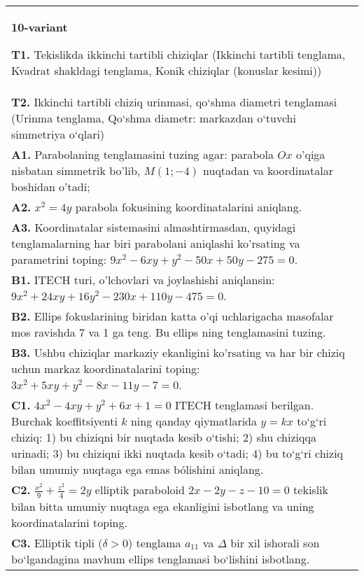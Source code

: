 \documentclass{article}
\begin{document}
\begin{tabular}{m{17cm}}
\textbf{10-variant}
\newline

\textbf{T1.} Tekislikda ikkinchi tartibli chiziqlar (Ikkinchi tartibli tenglama, Kvadrat shakldagi tenglama, Konik chiziqlar (konuslar kesimi)) \\
\textbf{T2.} Ikkinchi tartibli chiziq urinmasi, qo‘shma diametri tenglamasi (Urinma tenglama, Qo‘shma diametr: markazdan o‘tuvchi simmetriya o‘qlari) \\
\textbf{A1.} Parabolaning tenglamasini tuzing agar: parabola $O x$ o'qiga nisbatan simmetrik bo'lib, $M(1 ;-4)$ nuqtadan va koordinatalar boshidan o'tadi; \\
\textbf{A2.} $x^2=4 y$ parabola fokusining koordinatalarini aniqlang. \\
\textbf{A3.} Koordinatalar sistemasini almashtirmasdan, quyidagi tenglamalarning har biri parabolani aniqlashi ko'rsating va parametrini toping: $9 x^2-6 x y+y^2-50 x+50 y-275=0$. \\
\textbf{B1.} ITECH turi, o'lchovlari va joylashishi aniqlansin: $9 x^2+24 x y+16 y^2-230 x+110 y-475=0$. \\
\textbf{B2.} Ellips fokuslarining biridan katta o'qi uchlarigacha masofalar mos ravishda 7 va 1 ga teng. Bu ellips ning tenglamasini tuzing. \\
\textbf{B3.} Ushbu chiziqlar markaziy ekanligini ko'rsating va har bir chiziq uchun markaz koordinatalarini toping: $3x^2+5xy+y^2-8x-11y-7=0$. \\
\textbf{C1.} $4 x^2-4 x y+y^2+6 x+1=0$ ITECH tenglamasi berilgan. Burchak koeffitsiyenti $k$ ning qanday qiymatlarida $y=kx$ to‘g‘ri chiziq: 1) bu chiziqni bir nuqtada kesib o‘tishi; 2) shu chiziqqa urinadi; 3) bu chiziqni ikki nuqtada kesib o‘tadi; 4) bu to‘g‘ri chiziq bilan umumiy nuqtaga ega emas bólishini aniqlang. \\
\textbf{C2.} $\frac{x^2}{9}+\frac{z^2}{4}=2 y$ elliptik paraboloid $2 x-2 y-z-10=0$ tekislik bilan bitta umumiy nuqtaga ega ekanligini isbotlang va uning koordinatalarini toping. \\
\textbf{C3.} Elliptik tipli ($\delta>0$) tenglama $a_{11}$ va $\Delta$ bir xil ishorali son bo‘lgandagina mavhum ellips tenglamasi bo‘lishini isbotlang. \\

\end{tabular}
\vspace{1cm}
\end{document}
